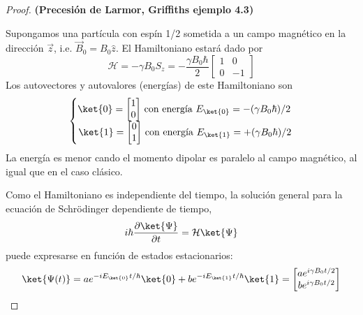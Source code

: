 \documentclass[a4paper,11pt]{book} %
\numberwithin{equation}{chapter}
\def\lch{\left\{}
\begin{document}
\begin{proof}
\textbf{(Precesión de Larmor, Griffiths \cite{bib_griffiths_schroeter_2018} ejemplo 4.3)} 

Supongamos una partícula con espín 1/2 sometida a un campo magnético en la dirección $\vec{z}$, i.e. $\vec{B}_0 = B_0 \hat{z}$. El Hamiltoniano estará dado por 
	\begin{equation}
	\mathcal{H} = - \gamma B_0 S_z = - \frac{\gamma B_0 \hbar}{2} 
	\begin{bmatrix}	1 & 0 \\ 0 & -1 \end{bmatrix}
	\end{equation}
Los autovectores y autovalores (energías) de este Hamiltoniano son
	\begin{equation}
	\lch 
	\begin{matrix}
	\ket{0} = \begin{bmatrix} 1 \\ 0 \end{bmatrix} \, 
	\text{con energía } E_{\ket{0}} = - (\gamma B_0 \hbar) /2 \, \\
	\ket{1} = \begin{bmatrix} 0 \\ 1 \end{bmatrix} \, 
	\text{con energía } E_{\ket{1}} = + (\gamma B_0 \hbar) / 2
	\end{matrix}
	\right.
	\end{equation}
La energía es menor cando el momento dipolar es paralelo al campo magnético, al igual que en el caso clásico.

Como el Hamiltoniano es independiente del tiempo, la solución general para la ecuación de Schrödinger dependiente de tiempo,
	\begin{equation} \label{ec_Hardware_NMR_schrodinger}
	i \hbar \frac{\partial \ket{\Psi}}{\partial t} = \mathcal{H} \ket{\Psi}
	\end{equation}
puede expresarse en función de estados estacionarios:
	\begin{equation} \label{ec_Hardware_NMR_schrodinger_sol}
	\ket{\Psi (t)} = a  e^{-i E_{\ket{0}} t/ \hbar} \ket{0} + b  e^{-i E_{\ket{1}} t/ \hbar} \ket{1}  =
	\begin{bmatrix}
	a e ^{i \gamma B_0 t/2} \\
	b e ^{i \gamma B_0 t/2}
	\end{bmatrix}
	\end{equation}


\end{proof}
\end{document}
